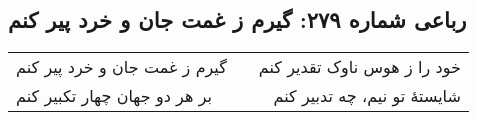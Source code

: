 \begin{center}
\section*{رباعی شماره ۲۷۹: گیرم ز غمت جان و خرد پیر کنم}
\label{sec:sh279}
\begin{longtable}{l p{0.5cm} r}
گیرم ز غمت جان و خرد پیر کنم
&&
خود را ز هوس ناوک تقدیر کنم
\\
بر هر دو جهان چهار تکبیر کنم
&&
شایستهٔ تو نیم، چه تدبیر کنم
\\
\end{longtable}
\end{center}
